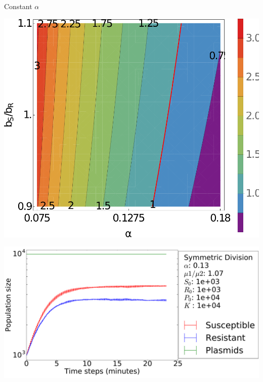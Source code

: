 \documentclass[final]{beamer}
\newlength{\onecolwid}
\newlength{\figwid}
\begin{document}
\begin{frame}[t]
\begin{block}
\begin{columns}[t]
\begin{column}{\onecolwid}
  \begin{block}{Constant $\alpha$}
  \begin{center}
    \includegraphics[width=\figwid]{../dev/graphics/poster/const_contour.pdf}

    \includegraphics[width=\figwid]{../dev/graphics/poster/const_pop.pdf}
  \end{center}


\end{block}
\end{column}
\end{columns}
\end{block}
\end{frame}
\end{document}
